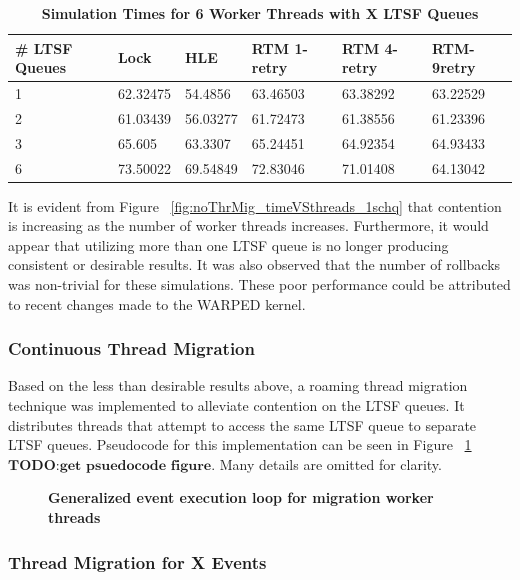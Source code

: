 \documentclass[a4paper]{article}
\begin{document}
\begin{table}[H]
    \centering
    \begin{tabular}{l|p{2cm}|p{2cm}|p{2cm}|p{2cm}|p{2cm}}
        \textbf{\# LTSF Queues}&Lock &HLE &RTM 1-retry &RTM 4-retry &RTM-9retry \\
        \hline
        \midrule
            1 &62.32475 &54.4856  &63.46503 &63.38292 &63.22529 \\  
            2 &61.03439 &56.03277 &61.72473 &61.38556 &61.23396 \\  
            3 &65.605   &63.3307  &65.24451 &64.92354 &64.93433 \\  
            6 &73.50022 &69.54849 &72.83046 &71.01408 &64.13042   
    \end{tabular}
    \caption{\textbf{Simulation Times for 6 Worker Threads with X LTSF Queues}}
    \label{tab:noThrMig_6threadsXschq}
\end{table}

It is evident from Figure ~\ref{fig:noThrMig_timeVSthreads_1schq} that
contention is increasing as the number of worker threads increases.
Furthermore, it would appear that utilizing more than one LTSF queue is no
longer producing consistent or desirable results. It was also observed that the
number of rollbacks was non-trivial for these simulations.  These poor
performance could be attributed to recent changes made to the WARPED kernel.\par

\subsubsection{\textbf{Continuous Thread Migration}}

Based on the less than desirable results above, a roaming thread migration
technique was implemented to alleviate contention on the LTSF queues.  It
distributes threads that attempt to access the same LTSF queue to separate LTSF
queues.  Pseudocode for this implementation can be seen in Figure
~\ref{fig:thread_migration} \(\textbf{TODO:get psuedocode figure}\).  Many
details are omitted for clarity.\par

\begin{figure}[H]
    \centering
    \graphicspath{ {./data/} }
    \caption{\textbf{Generalized event execution loop for migration worker
    threads}}
    \label{fig:thread_migration}
\end{figure}

\subsubsection{\textbf{Thread Migration for X Events}}
\end{document}
